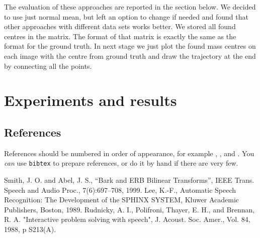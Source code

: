 \documentclass[10pt,a4paper,oneclumn]{article}
\begin{document}
The evaluation of these approaches are reported in the section below. We decided to use just normal mean, but left an option to change if needed and found that other approaches with different data sets works better. We stored all found centres in the matrix. The format of that matrix is exactly the same as the format for the ground truth. In next stage we just plot the found mass centres on each image with the centre from ground truth and draw the trajectory at the end by connecting all the points.

\section{Experiments and results}



\subsection{References}

References should be numbered in order of appearance, 
for example \cite{ES1}, \cite{ES2}, and \cite{ES3}. 
You \emph{can} use \texttt{bibtex} to prepare references,
or do it by hand if there are very few.

%

\begin{thebibliography}{10}
 Smith, J. O. and Abel, J. S., 
``Bark and {ERB} Bilinear Transforms'', 
IEEE Trans. Speech and Audio Proc., 7(6):697--708, 1999.  
 Lee, K.-F., Automatic Speech Recognition: 
The Development of the 
SPHINX SYSTEM, Kluwer Academic Publishers, Boston, 1989.
 Rudnicky, A. I., Polifroni, Thayer, E. H.,
 and Brennan, R. A.  
"Interactive problem solving with speech", J. Acoust. Soc. Amer., 
Vol. 84, 1988, p S213(A).
\end{thebibliography}
\end{document}
